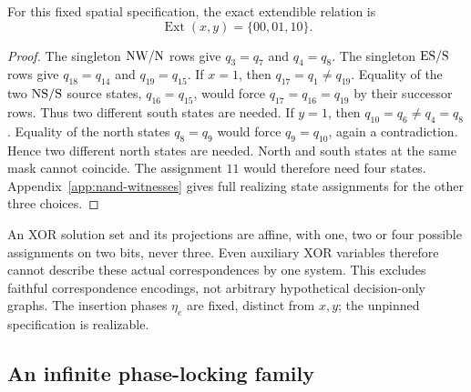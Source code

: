 \begin{proposition}\label{prop:nand8}
For this fixed spatial specification, the exact extendible relation is
\[
 \operatorname{Ext}(x,y)=\{00,01,10\}.
\]
\end{proposition}
\begin{proof}
The singleton $\mathrm{N}\mathrm{W}/\mathrm{N}$ rows give $q_3=q_7$ and $q_4=q_8$.
The singleton $\mathrm{E}\mathrm{S}/\mathrm{S}$ rows give $q_{18}=q_{14}$ and $q_{19}=q_{15}$.
If $x=1$, then $q_{17}=q_1\ne q_{19}$. Equality of the two $\mathrm{N}\mathrm{S}/\mathrm{S}$
source states, $q_{16}=q_{15}$, would force $q_{17}=q_{16}=q_{19}$ by their
successor rows. Thus two different south states are needed. If $y=1$, then
$q_{10}=q_6\ne q_4=q_8$. Equality of the north states $q_8=q_9$ would force
$q_9=q_{10}$, again a contradiction. Hence two different north states are needed.
North and south states at the same mask cannot coincide. The assignment $11$
would therefore need four states. Appendix~\ref{app:nand-witnesses} gives full
realizing state assignments for the other three choices.
\end{proof}

An XOR solution set and its projections are affine, with one, two or four possible
assignments on two bits, never three. Even auxiliary XOR variables therefore cannot
describe these actual correspondences by one system. This excludes faithful
correspondence encodings, not arbitrary hypothetical decision-only graphs. The
insertion phases $\eta_e$ are fixed, distinct from $x,y$; the unpinned specification
is realizable.

\subsection{An infinite phase-locking family}\label{subsec:phase-locking}

